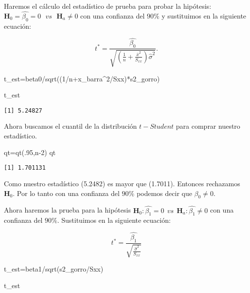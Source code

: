 \documentclass[
  a4paper,
  oneside,
  openany]{book}
\newenvironment{Shaded}{\begin{snugshade}}{\end{snugshade}}
\newcommand{\DecValTok}[1]{\textcolor[rgb]{0.00,0.00,0.81}{#1}}
\newcommand{\FunctionTok}[1]{\textcolor[rgb]{0.00,0.00,0.00}{#1}}
\newcommand{\NormalTok}[1]{#1}
\newcommand{\OtherTok}[1]{\textcolor[rgb]{0.56,0.35,0.01}{#1}}
\newcommand{\SpecialCharTok}[1]{\textcolor[rgb]{0.00,0.00,0.00}{#1}}
\begin{document}
Haremos el cálculo del estadístico de prueba para probar la hipótesis: \(\textbf{H}_0=\hat{\beta_{0}}=0 \ \ \ vs \ \ \ \textbf{H}_a \neq 0\) con una confianza del \(90\%\) y sustituimos en la siguiente ecuación:

\[t^*=\frac{\hat{\beta_{0}}}{\sqrt{\left(\frac{1}{n}+\frac{\overline{x}^2}{S_{xx}}\right)\hat{\sigma}^2}}.\]

\begin{Shaded}
\begin{Highlighting}[]
\NormalTok{t\_est}\OtherTok{=}\NormalTok{beta0}\SpecialCharTok{/}\FunctionTok{sqrt}\NormalTok{((}\DecValTok{1}\SpecialCharTok{/}\NormalTok{n}\SpecialCharTok{+}\NormalTok{x\_barra}\SpecialCharTok{\^{}}\DecValTok{2}\SpecialCharTok{/}\NormalTok{Sxx)}\SpecialCharTok{*}\NormalTok{s2\_gorro)}

\NormalTok{t\_est}
\end{Highlighting}
\end{Shaded}

\begin{verbatim}
[1] 5.24827
\end{verbatim}

Ahora buscamos el cuantil de la distribución \(t-Student\) para comprar nuestro estadístico.

\begin{Shaded}
\begin{Highlighting}[]
\NormalTok{qt}\OtherTok{=}\FunctionTok{qt}\NormalTok{(.}\DecValTok{95}\NormalTok{,n}\DecValTok{{-}2}\NormalTok{) }
\NormalTok{qt}
\end{Highlighting}
\end{Shaded}

\begin{verbatim}
[1] 1.701131
\end{verbatim}

Como nuestro estadístico (5.2482) es mayor que (1.7011). Entonces rechazamos \(\textbf{H}_0\). Por lo tanto con una confianza del \(90\%\) podemos decir que \(\beta_{0} \neq 0.\)

Ahora haremos la prueba para la hipótesis \(\textbf{H}_0:\hat{\beta_{1}}=0 \ \ vs \ \ \textbf{H}_{a}:\hat{\beta_{1}} \neq 0\) con una confianza del \(90\%\). Sustituimos en la siguiente ecuación:

\[t^*=\frac{\hat{\beta_{1}}}{\sqrt{\frac{\hat{\sigma}^2}{S_{xx}}}}\]

\begin{Shaded}
\begin{Highlighting}[]
\NormalTok{t\_est}\OtherTok{=}\NormalTok{beta1}\SpecialCharTok{/}\FunctionTok{sqrt}\NormalTok{(s2\_gorro}\SpecialCharTok{/}\NormalTok{Sxx)}

\NormalTok{t\_est}
\end{Highlighting}
\end{Shaded}
\end{document}
